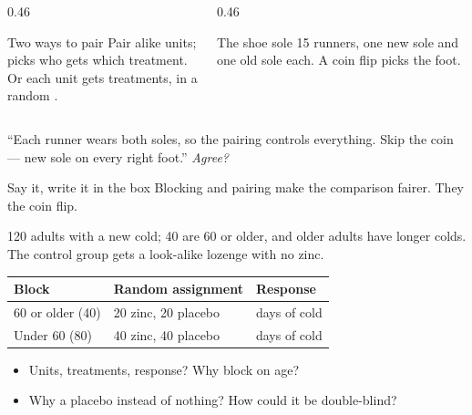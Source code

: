 \documentclass[aspectratio=169, 11pt]{beamer}
\begin{document}
\begin{frame}[t, plain]
  \vspace{4pt}
  \begin{columns}[t]
    \begin{column}{0.46\textwidth}
      \begin{block}{Two ways to pair}
        Pair alike units;  picks who gets which treatment.\\
        Or each unit gets  treatments, in a random .
      \end{block}
    \end{column}
    \begin{column}{0.46\textwidth}
      \begin{block}{The shoe sole}
        15 runners, one new sole and one old sole each. A coin flip picks the foot.
      \end{block}
    \end{column}
  \end{columns}
  \vspace{8pt}
  ``Each runner wears both soles, so the pairing controls everything. Skip the coin --- new
  sole on every right foot.'' \emph{Agree?}
  \vspace{8pt}
  \begin{block}{Say it, write it in the box}
    Blocking and pairing make the comparison fairer. They  the coin flip.
  \end{block}
\end{frame}

\begin{frame}[t, plain]
  120 adults with a new cold; 40 are 60 or older, and older adults have longer colds. The
  control group gets a look-alike lozenge with no zinc.
  \vspace{4pt}
  \begin{center}
  {\small\renewcommand{\arraystretch}{1.3}
  \begin{tabular}{@{} l l l @{}}
    \textbf{Block} & \textbf{Random assignment} & \textbf{Response} \\ \hline
    60 or older (40) & 20 zinc, 20 placebo & days of cold \\
    Under 60 (80) & 40 zinc, 40 placebo & days of cold \\
  \end{tabular}}
  \end{center}
  \begin{itemize}\setlength{\itemsep}{3pt}
    \item Units, treatments, response? Why block on age?
    \item Why a placebo instead of nothing? How could it be double-blind?
  \end{itemize}
\end{frame}
\end{document}
